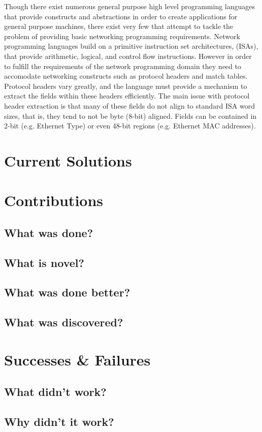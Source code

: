 Though there exist numerous general purpose high level programming languages
that provide constructs and abstractions in order to create applications for
general purpose machines, there exist very few that attempt to tackle the
problem of providing basic networking programming requirements. Network
programming languages build on a primitive instruction set architectures,
(ISAs), that provide arithmetic, logical, and control flow instructions.
However in order to fulfill the requirements of the network programming domain
they need to accomodate networking constructs such as protocol headers and 
match tables. Protocol headers vary greatly, and the language must provide
a mechanism to extract the fields within these headers efficiently. The main
issue with protocol header extraction is that many of these fields do not
align to standard ISA word sizes, that is, they tend to not be byte (8-bit)
aligned. Fields can be contained in 2-bit (e.g. Ethernet Type) or even 48-bit
regions (e.g. Ethernet MAC addresses).

\section{Current Solutions}


\section{Contributions}

\subsection{What was done?}

\subsection{What is novel?}

\subsection{What was done better?}

\subsection{What was discovered?}

\section{Successes \& Failures}

\subsection{What didn't work?}

\subsection{Why didn't it work?}
